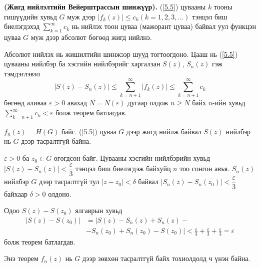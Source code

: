 \begin{thm}
\textbf{(Жигд нийлэлтийн Вейерштрассын шинжүүр). } (\ref{5.5}) цувааны $k$ тооны гишүүдийн хувьд $G$ муж дээр $|f_k(z)|\leq c_k(k=1,2,3,\ldots)$ тэнцэл биш биелэгдэхэд $\sum\limits_{k=1}^\infty c_k$ нь  нийлэх тоон цуваа (мажорант цуваа) байвал уул функцэн цуваа $G$ муж дээр абсолют бөгөөд жигд нийлнэ.
\end{thm}
\begin{prf}
Абсолют нийлэх нь жишилтийн шинжээр шууд тогтоогдоно. Цааш нь (\ref{5.5}) цувааны нийлбэр ба хэсгийн нийлбэрийг харгалзан $S(z)$, $S_n(z)$ гэж тэмдэглэвэл 
$$|S(z)-S_n(z)|\leq \sum\limits_{k=n+1}^\infty |f_{k}(z)|\leq \sum\limits_{k=n+1}^\infty c_k$$
бөгөөд аливаа $\varepsilon >0$ авахад $N=N(\varepsilon)$ дугаар олдож $n\geq N$ байх $n$-ийн хувьд $\sum\limits_{k=n+1}^\infty c_k<\varepsilon$ болж теорем батлагдав. 
\end{prf}
\begin{thm} \label{Теорем 2}
$f_n(z)=H(G)$ байг. (\ref{5.5}) цуваа $G$ дээр жигд нийлж байвал $S(z)$ нийлбэр нь $G$ дээр тасралтгүй байна.
\end{thm}
\begin{prf}
$\varepsilon >0$ ба $z_0\in G$ өгөгдсөн байг. Цувааны хэсгийн нийлбэрийн хувьд $|S(z)-S_n(z)|<\dfrac{\varepsilon}{3}$ тэнцэл биш биелэгдэж байхуйц $n$ тоо сонгон авъя. $S_n(z)$ нийлбэр $G$ дээр тасралтгүй тул $|z-z_0|<\delta$ байвал $|S_n(z)-S_n(z_0)|<\dfrac{\varepsilon}{3}$ байхаар $\delta > 0$ олдоно.

Одоо $S(z)-S(z_0)$ ялгаврын хувьд
\begin{align*}
    |S(z)-S(z_0)|&=|S(z)-S_n(z)+S_n(z)- \\
    &-S_n(z_0)+S_n(z_0)-S(z_0)|<\frac{\varepsilon}{3}+\frac{\varepsilon}{3}+\frac{\varepsilon}{3}=\varepsilon
\end{align*}
болж теорем батлагдав.
\end{prf}
Энэ теорем $f_n(z)$ нь $G$ дээр зөвхөн тасралтгүй байх тохиолдолд ч үнэн байна.

